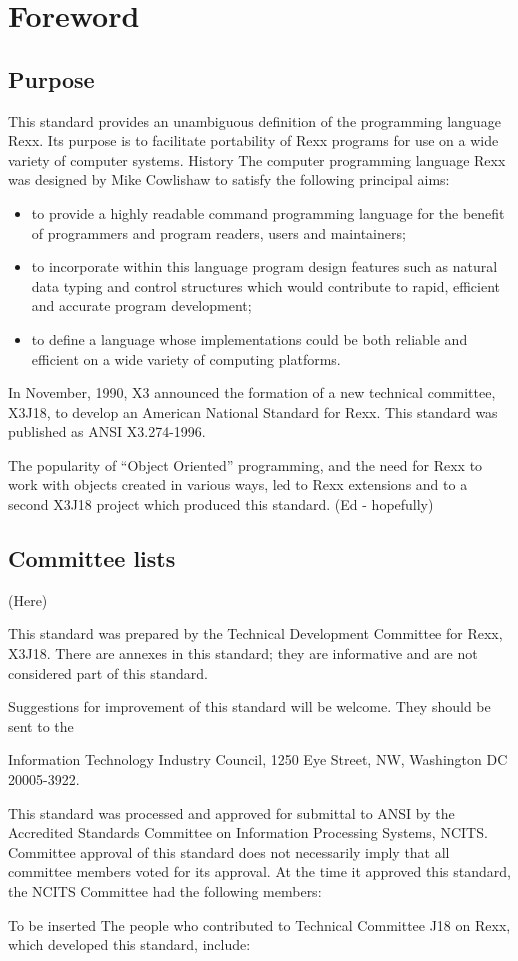 \chapter{Foreword}\label{foreword}

\section{Purpose}\label{purpose}

This standard provides an unambiguous definition of the programming
language Rexx. Its purpose is to facilitate portability of Rexx programs
for use on a wide variety of computer systems. History The computer
programming language Rexx was designed by Mike Cowlishaw to satisfy the
following principal aims:

\begin{itemize}
\item
  to provide a highly readable command programming language for the
  benefit of programmers and program readers, users and maintainers;
\item
  to incorporate within this language program design features such as
  natural data typing and control structures which would contribute to
  rapid, efficient and accurate program development;
\item
  to define a language whose implementations could be both reliable and
  efficient on a wide variety of computing platforms.
\end{itemize}

In November, 1990, X3 announced the formation of a new technical
committee, X3J18, to develop an American National Standard for Rexx.
This standard was published as ANSI X3.274-1996.

The popularity of ``Object Oriented'' programming, and the need for Rexx
to work with objects created in various ways, led to Rexx extensions and
to a second X3J18 project which produced this standard. (Ed - hopefully)

\section{Committee lists}\label{committee-lists}

(Here)

This standard was prepared by the Technical Development Committee for
Rexx, X3J18. There are annexes in this standard; they are informative
and are not considered part of this standard.

Suggestions for improvement of this standard will be welcome. They
should be sent to the

Information Technology Industry Council, 1250 Eye Street, NW, Washington
DC 20005-3922.

This standard was processed and approved for submittal to ANSI by the
Accredited Standards Committee on Information Processing Systems, NCITS.
Committee approval of this standard does not necessarily imply that all
committee members voted for its approval. At the time it approved this
standard, the NCITS Committee had the following members:

To be inserted The people who contributed to Technical Committee J18 on
Rexx, which developed this standard, include:
